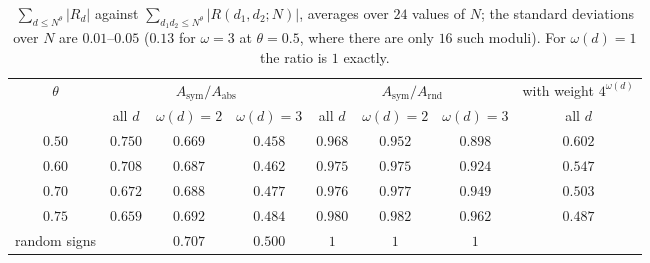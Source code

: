 \documentclass[11pt]{amsart}
\theoremstyle{remark}
\begin{document}
\begin{table}[htbp]
\centering\small
\begin{tabular}{c|ccc|ccc|c}
\toprule
$\theta$ & \multicolumn{3}{c|}{$A_{\mathrm{sym}}/A_{\mathrm{abs}}$} & \multicolumn{3}{c|}{$A_{\mathrm{sym}}/A_{\mathrm{rnd}}$} & with weight $4^{\omega(d)}$\\
 & all $d$ & $\omega(d)=2$ & $\omega(d)=3$ & all $d$ & $\omega(d)=2$ & $\omega(d)=3$ & all $d$\\
\midrule
$0.50$ & $0.750$ & $0.669$ & $0.458$ & $0.968$ & $0.952$ & $0.898$ & $0.602$\\
$0.60$ & $0.708$ & $0.687$ & $0.462$ & $0.975$ & $0.975$ & $0.924$ & $0.547$\\
$0.70$ & $0.672$ & $0.688$ & $0.477$ & $0.976$ & $0.977$ & $0.949$ & $0.503$\\
$0.75$ & $0.659$ & $0.692$ & $0.484$ & $0.980$ & $0.982$ & $0.962$ & $0.487$\\
\midrule
random signs & & $0.707$ & $0.500$ & $1$ & $1$ & $1$ & \\
\bottomrule
\end{tabular}
\caption{$\sum_{d\le N^\theta}|R_d|$ against $\sum_{d_1d_2\le N^\theta}|R(d_1,d_2;N)|$, averages over $24$ values of $N$; the standard deviations over $N$ are $0.01$--$0.05$ ($0.13$ for $\omega=3$ at $\theta=0.5$, where there are only $16$ such moduli). For $\omega(d)=1$ the ratio is $1$ exactly.}
\label{tab:ratios}
\end{table}
\end{document}
